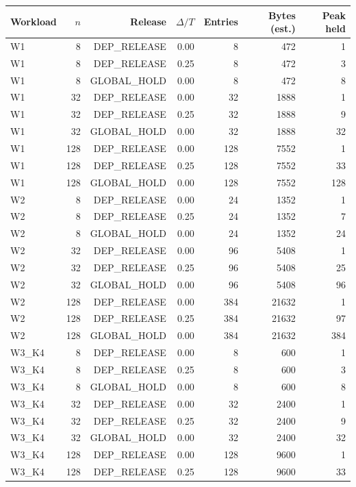 \begin{table}[t]
\centering
\begin{tabular}{lrrrrrr}
\toprule
Workload & $n$ & Release & $\Delta/T$ & Entries & Bytes (est.) & Peak held \\
\midrule
W1 & 8 & DEP\_RELEASE & 0.00 & 8 & 472 & 1 \\
W1 & 8 & DEP\_RELEASE & 0.25 & 8 & 472 & 3 \\
W1 & 8 & GLOBAL\_HOLD & 0.00 & 8 & 472 & 8 \\
W1 & 32 & DEP\_RELEASE & 0.00 & 32 & 1888 & 1 \\
W1 & 32 & DEP\_RELEASE & 0.25 & 32 & 1888 & 9 \\
W1 & 32 & GLOBAL\_HOLD & 0.00 & 32 & 1888 & 32 \\
W1 & 128 & DEP\_RELEASE & 0.00 & 128 & 7552 & 1 \\
W1 & 128 & DEP\_RELEASE & 0.25 & 128 & 7552 & 33 \\
W1 & 128 & GLOBAL\_HOLD & 0.00 & 128 & 7552 & 128 \\
W2 & 8 & DEP\_RELEASE & 0.00 & 24 & 1352 & 1 \\
W2 & 8 & DEP\_RELEASE & 0.25 & 24 & 1352 & 7 \\
W2 & 8 & GLOBAL\_HOLD & 0.00 & 24 & 1352 & 24 \\
W2 & 32 & DEP\_RELEASE & 0.00 & 96 & 5408 & 1 \\
W2 & 32 & DEP\_RELEASE & 0.25 & 96 & 5408 & 25 \\
W2 & 32 & GLOBAL\_HOLD & 0.00 & 96 & 5408 & 96 \\
W2 & 128 & DEP\_RELEASE & 0.00 & 384 & 21632 & 1 \\
W2 & 128 & DEP\_RELEASE & 0.25 & 384 & 21632 & 97 \\
W2 & 128 & GLOBAL\_HOLD & 0.00 & 384 & 21632 & 384 \\
W3\_K4 & 8 & DEP\_RELEASE & 0.00 & 8 & 600 & 1 \\
W3\_K4 & 8 & DEP\_RELEASE & 0.25 & 8 & 600 & 3 \\
W3\_K4 & 8 & GLOBAL\_HOLD & 0.00 & 8 & 600 & 8 \\
W3\_K4 & 32 & DEP\_RELEASE & 0.00 & 32 & 2400 & 1 \\
W3\_K4 & 32 & DEP\_RELEASE & 0.25 & 32 & 2400 & 9 \\
W3\_K4 & 32 & GLOBAL\_HOLD & 0.00 & 32 & 2400 & 32 \\
W3\_K4 & 128 & DEP\_RELEASE & 0.00 & 128 & 9600 & 1 \\
W3\_K4 & 128 & DEP\_RELEASE & 0.25 & 128 & 9600 & 33 \\

\end{tabular}
\end{table}
